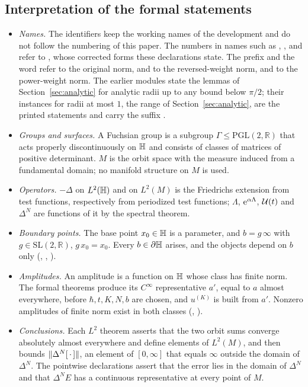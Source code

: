 \subsection{Interpretation of the formal statements}\label{subsec:lean-reading}
\begin{itemize}
\item \emph{Names.} The identifiers keep the working names of the development and do not follow the numbering of this paper.
The numbers in names such as , ,  and  refer to
\cite[Theorems~1.3 and~1.4, Corollaries~1.5 and~1.6]{S}, whose corrected forms these declarations state. The prefix  and the
word  refer to the original norm,  and  to the reversed-weight norm, and 
to the power-weight norm. The earlier modules state the lemmas of Section~\ref{sec:analytic} for analytic radii up to any bound below
$\pi/2$; their instances for radii at most $1$, the range of Section~\ref{sec:analytic}, are the printed statements and carry the
suffix .
\item \emph{Groups and surfaces.} A Fuchsian group is a subgroup $\Gamma\le\mathrm{PGL}(2,\mathbb R)$ that acts properly discontinuously on $\mathbb{H}$ and consists of classes of matrices of positive determinant. $M$ is the orbit space with the measure induced from a fundamental domain; no manifold structure on $M$ is used.
\item \emph{Operators.} $-\Delta$ on $L^2(\mathbb{H})$ and on $L^2(M)$ is the Friedrichs extension from test functions, respectively from periodized test functions; $\Lambda$, $\mathrm{e}^{\alpha\Lambda}$, $\mathcal{U}(t)$ and $\Delta^N$ are functions of it by the spectral theorem.
\item \emph{Boundary points.} The base point $x_0\in\mathbb{H}$ is a parameter, and $b=g\,\infty$ with $g\in\mathrm{SL}(2,\mathbb R)$, $g\,x_0=x_0$. Every $b\in\partial\mathbb{H}$ arises, and the objects depend on $b$ only (, , ).
\item \emph{Amplitudes.} An amplitude is a function on $\mathbb{H}$ whose class has finite norm. The formal theorems produce its $C^\infty$ representative $a'$, equal to $a$ almost everywhere, before $\hbar,t,K,N,b$ are chosen, and $u^{(K)}$ is built from $a'$. Nonzero amplitudes of finite norm exist in both classes (, ).
\item \emph{Conclusions.} Each $L^2$ theorem asserts that the two orbit sums converge absolutely almost everywhere and define elements of $L^2(M)$, and then bounds $\lVert \Delta^N[\,\cdot\,]\rVert$, an element of $[0,\infty]$ that equals $\infty$ outside the domain of $\Delta^N$. The pointwise declarations assert that the error lies in the domain of $\Delta^N$ and that $\Delta^NE$ has a continuous representative at every point of $M$.

\end{itemize}
